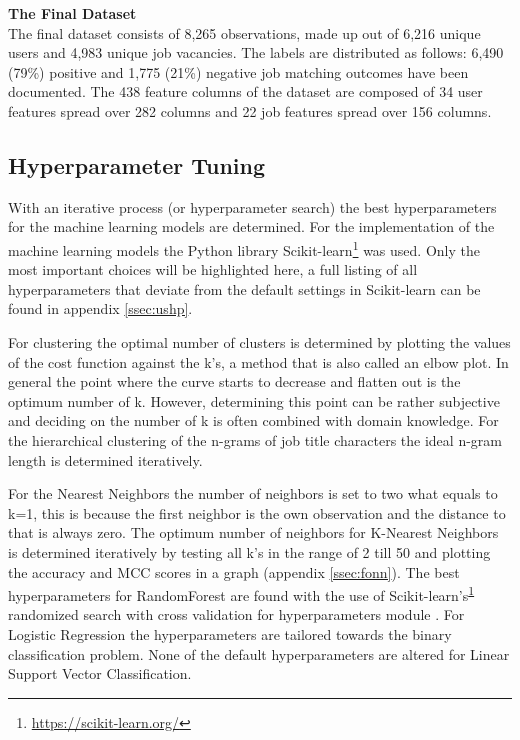 \noindent
\textbf{The Final Dataset}\\
The final dataset consists of 8,265 observations, made up out of 6,216 unique users and 4,983 unique job vacancies. 
The labels are distributed as follows: 6,490 (79\%) positive and 1,775 (21\%) negative job matching outcomes have been documented. 
The 438 feature columns of the dataset are composed of 34 user features spread over 282 columns and 22 job features spread over 156 columns. 

\subsection{Hyperparameter Tuning}
\label{ssec:ht}
With an iterative process (or hyperparameter search) the best hyperparameters for the machine learning models are determined. 
For the implementation of the machine learning models the Python library Scikit-learn\footnote{\url{https://scikit-learn.org/}\label{note1}} was used.
Only the most important choices will be highlighted here, a full listing of all hyperparameters that deviate from the default settings in Scikit-learn can be found in appendix \ref{ssec:ushp}.

For clustering the optimal number of clusters is determined by plotting the values of the cost function against the k’s, a method that is also called an elbow plot.
In general the point where the curve starts to decrease and flatten out is the optimum number of k. 
However, determining this point can be rather subjective and deciding on the number of k is often combined with domain knowledge.
For the hierarchical clustering of the n-grams of job title characters the ideal n-gram length is determined iteratively. 

For the Nearest Neighbors the number of neighbors is set to two what equals to k=1, this is because the first neighbor is the own observation and the distance to that is always zero.
The optimum number of neighbors for K-Nearest Neighbors is determined iteratively by testing all k’s in the range of 2 till 50 and plotting the accuracy and MCC scores in a graph (appendix \ref{ssec:fonn}).
The best hyperparameters for RandomForest are found with the use of Scikit-learn’s\textsuperscript{\ref{note1}} randomized search with cross validation for hyperparameters module \cite{ bergstra2012random}.
For Logistic Regression the hyperparameters are tailored towards the binary classification problem. 
None of the default hyperparameters are altered for Linear Support Vector Classification. 

